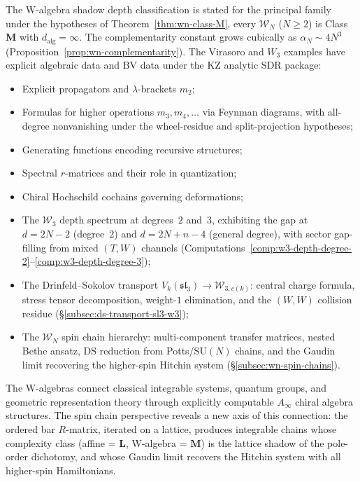 The W-algebra shadow depth classification is stated
for the principal family under the hypotheses of
Theorem~\ref{thm:wn-class-M}, every $\mathcal{W}_N$ ($N \ge 2$) is
Class~$\mathbf{M}$ with $d_{\mathrm{alg}} = \infty$. The complementarity
constant grows cubically as $\alpha_N \sim 4N^3$
(Proposition~\ref{prop:wn-complementarity}). The Virasoro and
$W_3$ examples have explicit algebraic data and BV data under the
KZ analytic SDR package:
\begin{itemize}
\item Explicit propagators and $\lambda$-brackets $m_2$;
\item Formulas for higher operations $m_3, m_4, \ldots$ via
 Feynman diagrams, with all-degree nonvanishing under the
 wheel-residue and split-projection hypotheses;
\item Generating functions encoding recursive structures;
\item Spectral $r$-matrices and their role in quantization;
\item Chiral Hochschild cochains governing deformations;
\item The $\mathcal{W}_3$ depth spectrum at degrees~$2$ and~$3$,
 exhibiting the gap at $d = 2N - 2$ (degree~$2$) and
 $d = 2N + n - 4$ (general degree), with sector gap-filling from
 mixed $(T,W)$ channels
 (Computations~\ref{comp:w3-depth-degree-2}--\ref{comp:w3-depth-degree-3});
\item The Drinfeld--Sokolov transport $V_k(\mathfrak{sl}_3)
 \to \mathcal{W}_{3,c(k)}$: central charge formula, stress
 tensor decomposition, weight-$1$ elimination, and the
 $(W,W)$ collision residue
 (\S\ref{subsec:ds-transport-sl3-w3});
\item The $\mathcal{W}_N$ spin chain hierarchy: multi-component
 transfer matrices, nested Bethe ansatz, DS reduction from
 Potts/$\mathrm{SU}(N)$ chains, and the Gaudin limit
 recovering the higher-spin Hitchin system
 (\S\ref{subsec:wn-spin-chains}).
\end{itemize}

The W-algebras connect classical integrable systems, quantum groups, and geometric representation theory through explicitly computable $A_\infty$ chiral algebra structures. The spin chain perspective reveals a new axis of this connection: the ordered bar $R$-matrix, iterated on a lattice, produces integrable chains whose complexity class (affine = $\mathbf{L}$, W-algebra = $\mathbf{M}$) is the lattice shadow of the pole-order dichotomy, and whose Gaudin limit recovers the Hitchin system with all higher-spin Hamiltonians.

